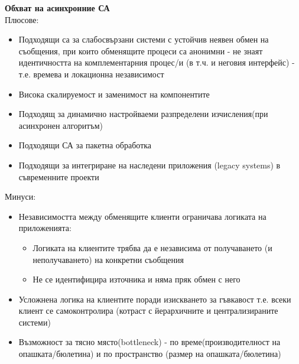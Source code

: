 \documentclass[11pt]{article} %
\begin{document}
\textbf{Обхват на асинхронние СА}\\
Плюсове:
\begin{itemize}[noitemsep]
	\item Подходящи са за слабосвързани системи с устойчив неявен обмен на съобщения, при които обменящите процеси са анонимни - не знаят идентичността на комплементарния процес/и (в т.ч. и неговия интерфейс) - т.е. времева и локационна независимост
	\item Висока скалируемост и заменимост на компонентите
	\item Подходящ за динамично настройваеми разпределени изчисления(при асинхронен алгоритъм)
	\item Подходящи СА за пакетна обработка
	\item Подходящи за интегриране на наследени приложения (legacy systems) в съвременните проекти
\end{itemize}
Минуси:
\begin{itemize}[noitemsep]
	\item Независимостта между обменящите клиенти ограничава логиката на приложенията:
	\begin{itemize}[noitemsep]
		\item Логиката на клиентите трябва да е независима от получаването (и неполучаването) на конкретни съобщения
		\item Не се идентифицира източника и няма пряк обмен с него
	\end{itemize}
	\item Усложнена логика на клиентите поради изискването за гъвкавост т.е. всеки клиент се самоконтролира (котраст с йерархичните и централизираните системи)
	\item Възможност за тясно място(bottleneck) - по време(производителност на опашката/бюлетина) и по пространство (размер на опашката/бюлетина)
\end{itemize}
\end{document}
